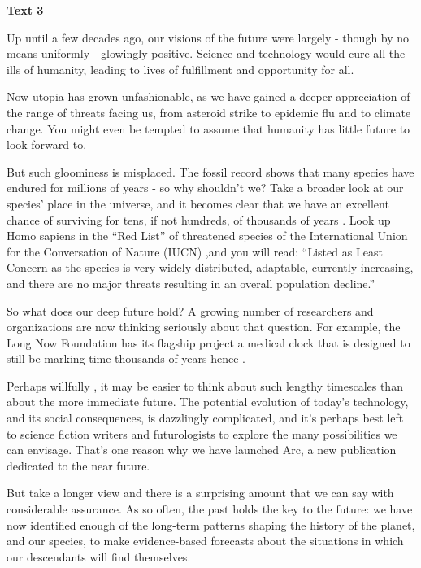 \begin{center}\textbf{Text 3}\end{center}

Up until a few decades ago, our visions of the future were largely - though by no means uniformly - glowingly positive. Science and technology would cure all the ills of humanity, leading to lives of fulfillment and opportunity for all.

Now utopia has grown unfashionable, as we have gained a deeper appreciation of the range of threats facing us, from asteroid strike to epidemic flu and to climate change. You might even be tempted to assume that humanity has little future to look forward to.

But such gloominess is misplaced. The fossil record shows that many species have endured for millions of years - so why shouldn't we? Take a broader look at our species' place in the universe, and it becomes clear that we have an excellent chance of surviving for tens, if not hundreds, of thousands of years . Look up Homo sapiens in the ``Red List'' of threatened species of the International Union for the Conversation of Nature (IUCN) ,and you will read: ``Listed as Least Concern as the species is very widely distributed, adaptable, currently increasing, and there are no major threats resulting in an overall population decline.''

So what does our deep future hold? A growing number of researchers and organizations are now thinking seriously about that question. For example, the Long Now Foundation has its flagship project a medical clock that is designed to still be marking time thousands of years hence .

Perhaps willfully , it may be easier to think about such lengthy timescales than about the more immediate future. The potential evolution of today's technology, and its social consequences, is dazzlingly complicated, and it's perhaps best left to science fiction writers and futurologists to explore the many possibilities we can envisage. That's one reason why we have launched Arc, a new publication dedicated to the near future.

But take a longer view and there is a surprising amount that we can say with considerable assurance. As so often, the past holds the key to the future: we have now identified enough of the long-term patterns shaping the history of the planet, and our species, to make evidence-based forecasts about the situations in which our descendants will find themselves.

